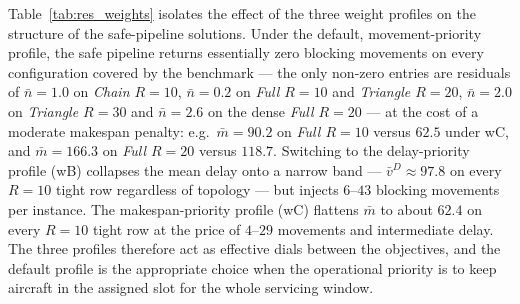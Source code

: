 Table~\ref{tab:res_weights} isolates the effect of the three weight
profiles on the structure of the safe-pipeline solutions.  Under the
default, movement-priority profile, the safe pipeline returns
essentially zero blocking movements on every configuration covered by
the benchmark --- the only non-zero entries are residuals of
$\bar n{=}1.0$ on \emph{Chain $R{=}10$}, $\bar n{=}0.2$ on
\emph{Full $R{=}10$} and \emph{Triangle $R{=}20$}, $\bar n{=}2.0$ on
\emph{Triangle $R{=}30$} and $\bar n{=}2.6$ on the dense
\emph{Full $R{=}20$} --- at the cost of a
moderate makespan penalty: e.g.\ $\bar m{=}90.2$ on
\emph{Full $R{=}10$} versus $62.5$ under wC, and $\bar m{=}166.3$ on
\emph{Full $R{=}20$} versus $118.7$.  Switching to the delay-priority
profile (wB) collapses the mean delay onto a narrow band ---
$\bar v^D \approx 97.8$ on every $R{=}10$ tight row regardless of
topology --- but injects $6$--$43$ blocking movements per instance.
The makespan-priority profile (wC) flattens $\bar m$ to about
$62.4$ on every $R{=}10$ tight row at the price of
$4$--$29$ movements and intermediate delay.  The three profiles
therefore act as effective dials between the objectives, and the
default profile is the appropriate choice when the operational
priority is to keep aircraft in the assigned slot for the whole
servicing window.



\FloatBarrier
